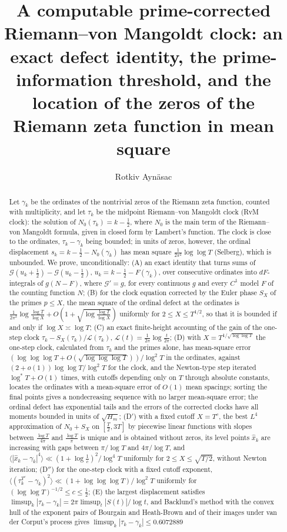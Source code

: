 \documentclass[preprint,12pt]{elsarticle}
\numberwithin{equation}{section}
\theoremstyle{plain}
\theoremstyle{definition}
\theoremstyle{remark}
\newcommand{\NO}{N_0}
\newcommand{\lL}{\mathcal L}
\begin{document}
\begin{frontmatter}
\title{A computable prime-corrected Riemann--von Mangoldt clock: an exact defect identity, the prime-information threshold, and the location of the zeros of the Riemann zeta function in mean square}
\author{Rotkiv Ayn\"asac}

\begin{abstract}
Let $\gamma_k$ be the ordinates of the nontrivial zeros of the Riemann zeta function, counted with multiplicity, and let $\tau_k$ be the midpoint Riemann--von Mangoldt clock (RvM clock): the solution of $\NO(\tau_k)=k-\frac12$, where $\NO$ is the main term of the Riemann--von Mangoldt formula, given in closed form by Lambert's function. The clock is close to the ordinates, $\tau_k-\gamma_k$ being bounded; in units of zeros, however, the ordinal displacement $s_k=k-\frac12-\NO(\gamma_k)$ has mean square $\frac1{2\pi^2}\log\log T$ (Selberg), which is unbounded. We prove, unconditionally: (A) an exact identity that turns sums of $\mathcal G(u_k+\frac12)-\mathcal G(u_k-\frac12)$, $u_k=k-\frac12-F(\gamma_k)$, over consecutive ordinates into $dF$-integrals of $g(N-F)$, where $\mathcal G'=g$, for every continuous $g$ and every $C^1$ model $F$ of the counting function $N$; (B) for the clock equation corrected by the Euler phase $S_X$ of the primes $p\le X$, the mean square of the ordinal defect at the ordinates is $\frac1{2\pi^2}\log\frac{\log T}{\log X}+O(1+\sqrt{\log\frac{\log T}{\log X}})$ uniformly for $2\le X\le T^{1/2}$, so that it is bounded if and only if $\log X\asymp\log T$; (C) an exact finite-height accounting of the gain of the one-step clock $\tau_k-S_X(\tau_k)/\lL(\tau_k)$, $\lL(t)=\frac1{2\pi}\log\frac t{2\pi}$; (D) with $X=T^{1/\sqrt{\log\log T}}$ the one-step clock, calculated from $\tau_k$ and the primes alone, has mean-square error $(\log\log\log T+O(\sqrt{\log\log\log T}))/\log^2T$ in the ordinates, against $(2+o(1))\log\log T/\log^2T$ for the clock, and the Newton-type step iterated $\log^*T+O(1)$ times, with cutoffs depending only on $T$ through absolute constants, locates the ordinates with a mean-square error of $O(1)$ mean spacings; sorting the final points gives a nondecreasing sequence with no larger mean-square error; the ordinal defect has exponential tails and the errors of the corrected clocks have all moments bounded in units of $\sqrt{H_m}$; (D$'$) with a fixed cutoff $X=T^c$, the best $L^4$ approximation of $\NO+S_X$ on $[\frac T2,3T]$ by piecewise linear functions with slopes between $\frac{\log T}{4\pi}$ and $\frac{\log T}\pi$ is unique and is obtained without zeros, its level points $\widehat x_k$ are increasing with gaps between $\pi/\log T$ and $4\pi/\log T$, and $\langle|\widehat x_k-\gamma_k|^4\rangle\ll(1+\log\frac1c)^2/\log^4T$ uniformly for $2\le X\le\sqrt{T/2}$, without Newton iteration; (D$''$) for the one-step clock with a fixed cutoff exponent, $\langle(\tau_k^{T^c}-\gamma_k)^2\rangle\ll(1+\log\log\log T)/\log^2T$ uniformly for $(\log\log T)^{-1/2}\le c\le\frac12$; (E) the largest displacement satisfies $\limsup_k|\tau_k-\gamma_k|=2\pi\limsup_t|S(t)|/\log t$, and Backlund's method with the convex hull of the exponent pairs of Bourgain and Heath-Brown and of their images under van der Corput's process gives $\limsup_k|\tau_k-\gamma_k|\le0.6072889$ 
\end{abstract}
\end{frontmatter}
\end{document}
